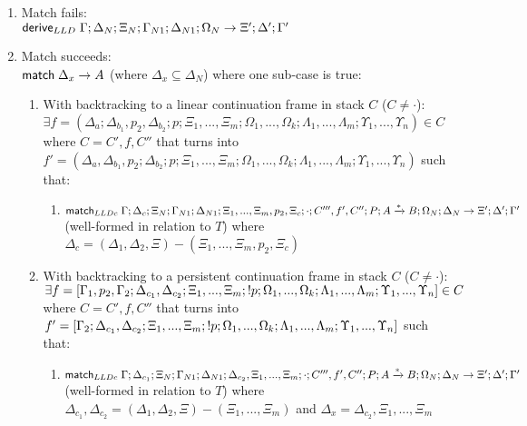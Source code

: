\begin{lemma}
\begin{enumerate}
   \item Match fails: \\
   $\mathsf{derive}_{LLD} \; \Gamma; \Delta_N; \Xi_N; \Gamma_{N1}; \Delta_{N1}; \Omega_N \rightarrow \Xi'; \Delta'; \Gamma'$
   
   \item Match succeeds: \\
   $\mathsf{match} \; \Delta_x \rightarrow A$ (where $\Delta_x \subseteq \Delta_N$) where one sub-case is true:
   
   \begin{enumerate}
      \item With backtracking to a linear continuation frame in stack $C$ ($C \neq \cdot$):\\
      $\exists f = (\Delta_a; \Delta_{b_1}, p_2, \Delta_{b_2}; p; \Xi_1, ..., \Xi_m; \Omega_1, ..., \Omega_k; \Lambda_1, ..., \Lambda_m; \Upsilon_1, ..., \Upsilon_n) \in C$ where $C = C', f, C''$ that turns into $f' = (\Delta_a, \Delta_{b_1}, p_2; \Delta_{b_2}; p; \Xi_1, ..., \Xi_m; \Omega_1, ..., \Omega_k; \Lambda_1, ..., \Lambda_m; \Upsilon_1, ..., \Upsilon_n)$ such that:
         \begin{enumerate}
            \item $\mathsf{match}_{LLDc} \; \Gamma; \Delta_c; \Xi_N; \Gamma_{N1}; \Delta_{N1}; \Xi_1, ..., \Xi_m, p_2, \Xi_c; \cdot; C''', f', C''; P; A \xrightarrow{*} B; \Omega_N; \Delta_N \rightarrow \Xi'; \Delta'; \Gamma'$ (well-formed in relation to $T$) where $\Delta_c = (\Delta_1, \Delta_2, \Xi) - (\Xi_1, ..., \Xi_m, p_2, \Xi_c)$
         \end{enumerate}
      
      \item With backtracking to a persistent continuation frame in stack $C$ ($C \neq \cdot$):\\
      $\exists f = [\Gamma_1, p_2, \Gamma_2; \Delta_{c_1}, \Delta_{c_2}; \Xi_1, ..., \Xi_m; {!} p; \Omega_1, ..., \Omega_k; \Lambda_1, ..., \Lambda_m; \Upsilon_1, ..., \Upsilon_n] \in C$ where $C = C', f, C''$ that turns into $f' = [\Gamma_2; \Delta_{c_1}, \Delta_{c_2}; \Xi_1, ..., \Xi_m; {!} p; \Omega_1, ..., \Omega_k; \Lambda_1, ..., \Lambda_m; \Upsilon_1, ..., \Upsilon_n]$ such that:
         \begin{enumerate}
            \item $\mathsf{match}_{LLDc} \; \Gamma; \Delta_{c_1}; \Xi_N; \Gamma_{N1}; \Delta_{N1}; \Delta_{c_2}, \Xi_1, ..., \Xi_m; \cdot; C''', f', C''; P; A \xrightarrow{*} B; \Omega_N; \Delta_N \rightarrow \Xi'; \Delta'; \Gamma'$ (well-formed in relation to $T$)
            where $\Delta_{c_1}, \Delta_{c_2} = (\Delta_1, \Delta_2, \Xi) - (\Xi_1, ..., \Xi_m)$ and $\Delta_x = \Delta_{c_2}, \Xi_1, ..., \Xi_m$
         \end{enumerate}
         

\end{enumerate}
\end{enumerate}
\end{lemma}
